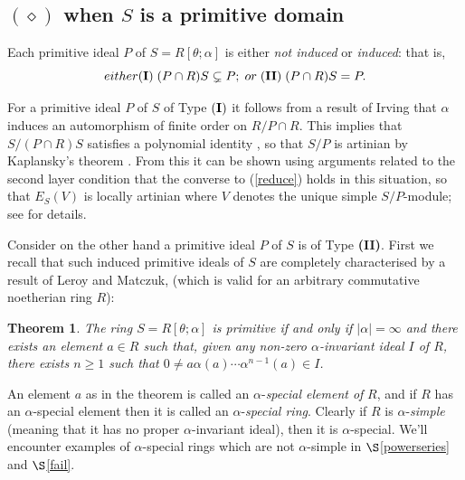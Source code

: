 \documentclass[a4paper, 11pt]{article}
\newtheorem{theorem}{Theorem}[section]
\theoremstyle{definition}
\begin{document}
\medskip

\subsection{$(\diamond)$  when $S$ is a primitive domain}\label{previous}  Each primitive ideal $P$ of $S  = R[\theta; \alpha]$ is either {\it not induced} or {\it induced}: that is,
$$ \textit{either }{\bf (I)}\;(P \cap R)S \subsetneq P; \;  \textit{ or } \; {\bf (II)} \;   (P \cap R)S = P.$$

\noindent For a primitive ideal $P$ of $S$ of Type ${\bf (I)}$ it follows from a result of Irving \cite{I} that $\alpha$ induces an automorphism of finite order on $R/P \cap R$. This implies that $S/(P \cap R)S$ satisfies a polynomial identity \cite[Corollary 10]{DS}, so that $S/P$ is artinian by Kaplansky's theorem \cite[Theorem I.13.4]{BG}. From this it can be shown using arguments related to the second layer condition that the converse to (\ref{reduce}) holds in this situation, so that $E_S(V)$ is locally artinian where $V$ denotes the unique simple $S/P$-module; see \cite[Theorem 3.4]{BCM} for details. 

\medskip

Consider on the other hand a primitive ideal $P$ of $S$ is of Type {\bf (II)}. First we recall that such induced primitive ideals of $S$ are completely characterised by a result of Leroy and Matczuk, (which is valid for an arbitrary commutative noetherian ring $R$):

\begin{theorem}\label{LMresult}\cite[Theorem 4.2]{LM} The ring $ S = R[\theta; \alpha]$ is primitive if and only if $|\alpha| = \infty$ and there exists an element $a \in R$ such that, given any non-zero $\alpha$-invariant ideal $I$ of $R$, there exists $n \geq 1$ such that $0 \neq a\alpha(a) \cdots \alpha^{n-1}(a) \in I$. 
\end{theorem}

\noindent An element $a$ as in the theorem  is called an $\alpha$-{\it special element of} $R$, and if $R$ has an $\alpha$-special element then it is called an $\alpha$-{\it special ring}. Clearly if $R$ is $\alpha$-{\it simple} (meaning that it has no proper $\alpha$-invariant ideal), then it is $\alpha$-special. We'll encounter examples of $\alpha$-special rings which are not $\alpha$-simple in $\S$\ref{powerseries} and $\S$\ref{fail}. 
\end{document}
